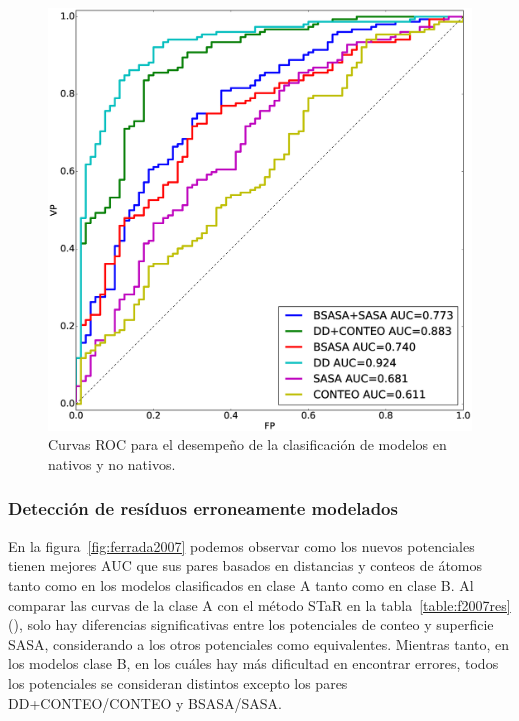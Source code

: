 \begin{figure}[tp]
\centering  
\includegraphics[width=\linewidth]{figures/resultados/prot/fold_assesment.eps}
\caption[Curvas ROC para la clasificación de estructuras en nativas y no nativas]{Curvas ROC para el desempeño de la clasificación de modelos en nativos y no nativos.}
\label{fig:ferrada2009}
\end{figure}

\subsubsection{Detección de resíduos erroneamente modelados}
\par
En la figura~\ref{fig:ferrada2007} podemos observar como los nuevos potenciales tienen mejores AUC que sus pares basados en distancias y conteos de átomos tanto como en los modelos clasificados en clase A tanto como en clase B.
Al comparar las curvas de la clase A con el método STaR en la tabla~\ref{table:f2007res} (\cite{Vergara2008}), solo hay diferencias significativas entre los potenciales de conteo y superficie SASA, considerando a los otros potenciales como equivalentes.
Mientras tanto, en los modelos clase B, en los cuáles hay más dificultad en encontrar errores, todos los potenciales se consideran distintos excepto los pares DD+CONTEO/CONTEO y BSASA/SASA.

